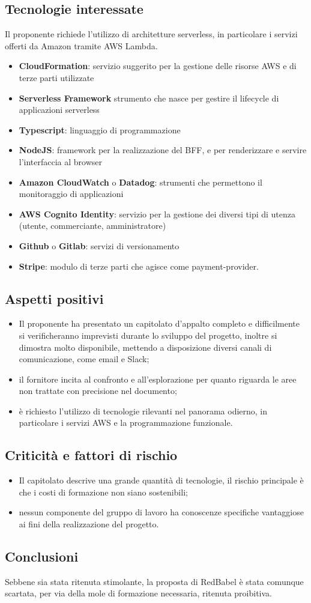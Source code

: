 \subsection{Tecnologie interessate}
Il proponente richiede l'utilizzo di architetture serverless, in particolare i servizi offerti da Amazon tramite AWS Lambda.
\begin{itemize}
	\item \textbf{CloudFormation}: servizio suggerito per la gestione delle risorse AWS e di terze parti utilizzate
    \item \textbf{Serverless Framework} strumento che nasce per gestire il lifecycle di applicazioni serverless
	\item \textbf{Typescript}: linguaggio di programmazione
	\item \textbf{NodeJS}: framework per la realizzazione del BFF, e per renderizzare e servire l'interfaccia al browser
	\item\textbf{Amazon CloudWatch} o \textbf{Datadog}: strumenti che permettono il monitoraggio di applicazioni
	\item \textbf{AWS Cognito Identity}: servizio per la gestione dei diversi tipi di utenza (utente, commerciante, amministratore)
	\item \textbf{Github} o \textbf{Gitlab}: servizi di versionamento
	\item \textbf{Stripe}: modulo di terze parti che agisce come payment-provider.
\end{itemize}
\subsection{Aspetti positivi}
\begin{itemize}
    \item Il proponente ha presentato un capitolato d'appalto completo e difficilmente si verificheranno imprevisti durante lo sviluppo del progetto, inoltre si dimostra molto disponibile, mettendo a disposizione diversi canali di comunicazione, come email e Slack;
    \item il fornitore incita al confronto e all'esplorazione per quanto riguarda le aree non trattate con precisione nel documento;
    \item è richiesto l'utilizzo di tecnologie rilevanti nel panorama odierno, in particolare i servizi AWS e la programmazione funzionale.
\end{itemize}
\subsection{Criticità e fattori di rischio}
\begin{itemize}
    \item Il capitolato descrive una grande quantità di tecnologie, il rischio principale è che i costi di formazione non siano sostenibili;
    \item nessun componente del gruppo di lavoro ha conoscenze specifiche vantaggiose ai fini della realizzazione del progetto.
\end{itemize}
\subsection{Conclusioni}
Sebbene sia stata ritenuta stimolante, la proposta di RedBabel è stata comunque scartata, per via della mole di formazione necessaria, ritenuta proibitiva.